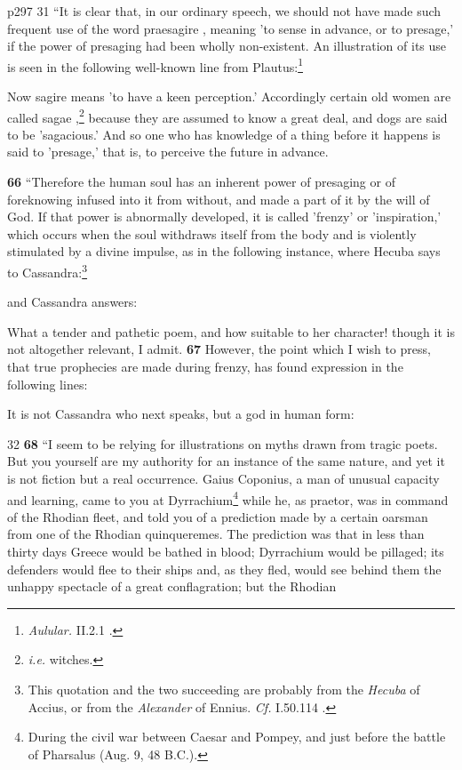 p297
31
``It is clear that, in our ordinary speech, we should not have made such frequent use of the word praesagire , meaning 'to sense in advance, or to presage,' if the power of presaging had been wholly non-existent. An illustration of its use is seen in the following well-known line from Plautus:\footnote{\emph{Aulular.} II.2.1 .

}

Now sagire means 'to have a keen perception.' Accordingly certain old women are called sagae ,\texthebrew{}\footnote{\emph{i.e.} witches.

} because they are assumed to know a great deal, and dogs are said to be 'sagacious.' And so one who has knowledge of a thing before it happens is said to 'presage,' that is, to perceive the future in advance.

\textbf{66} ``Therefore the human soul has an inherent power of presaging or of foreknowing infused into it from without, and made a part of it by the will of God. If that power is abnormally developed, it is called 'frenzy' or 'inspiration,' which occurs when the soul withdraws itself from the body and is violently stimulated by a divine impulse, as in the following instance, where Hecuba says to Cassandra:\footnote{This quotation and the two succeeding are probably from the \emph{Hecuba} of Accius, or from the \emph{Alexander} of Ennius. \emph{Cf.} I.50.114 .

}

and Cassandra answers:

What a tender and pathetic poem, and how suitable to her character! though it is not altogether relevant, I admit. \textbf{67} However, the point which I wish to press, that true prophecies are made during frenzy, has found expression in the following lines:

It is not Cassandra who next speaks, but a god in human form:

32
\textbf{68} ``I seem to be relying for illustrations on myths drawn from tragic poets. But you yourself are my authority for an instance of the same nature, and yet it is not fiction but a real occurrence. Gaius Coponius, a man of unusual capacity and learning, came to you at Dyrrachium\texthebrew{}\footnote{During the civil war between Caesar and Pompey, and just before the battle of Pharsalus (Aug. 9, 48 B.C.).

} while he, as praetor, was in command of the Rhodian fleet, and told you of a prediction made by a certain oarsman from one of the Rhodian quinqueremes. The prediction was that in less than thirty days Greece would be bathed in blood; Dyrrachium would be pillaged; its defenders would flee to their ships and, as they fled, would see behind them the unhappy spectacle of a great conflagration; but the Rhodian

